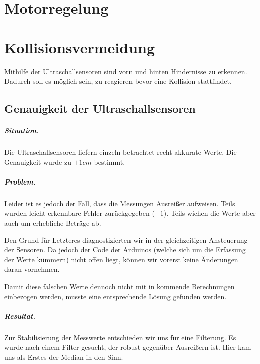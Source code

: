 \documentclass[a4paper,12pt]{report}
\begin{document}
\chapter{Motorregelung}	

\chapter{Kollisionsvermeidung}

	Mithilfe der Ultraschallsensoren sind vorn und hinten Hindernisse zu erkennen.
	Dadurch soll es möglich sein, zu reagieren bevor eine Kollision stattfindet.

\section{Genauigkeit der Ultraschallsensoren}

	\paragraph{Situation.}
	Die Ultraschallsensoren liefern einzeln betrachtet recht akkurate Werte.
	Die Genauigkeit wurde zu $\pm1cm$ bestimmt.
	
	\paragraph{Problem.}
	Leider ist es jedoch der Fall, dass die Messungen Ausreißer aufweisen.
	Teils wurden leicht erkennbare Fehler zurückgegeben ($-1$). Teils wichen die Werte aber auch um erhebliche Beträge ab.
	
	Den Grund für Letzteres diagnostizierten wir in der gleichzeitigen Ansteuerung der Sensoren.
	Da jedoch der Code der Arduinos (welche sich um die Erfassung der Werte kümmern) nicht offen liegt, können wir vorerst keine Änderungen daran vornehmen.
	
	Damit diese falschen Werte dennoch nicht mit in kommende Berechnungen einbezogen werden, musste eine entsprechende Lösung gefunden werden.

	\paragraph{Resultat.}
	Zur Stabilisierung der Messwerte entschieden wir uns für eine Filterung.
	Es wurde nach einem Filter gesucht, der robust gegenüber Ausreißern ist.
	Hier kam uns als Erstes der Median in den Sinn.
	
\end{document}
